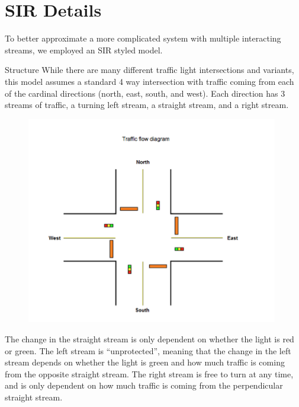 \documentclass[12pt]{article}
\begin{document}

\section{SIR Details}
To better approximate a more complicated system with multiple interacting streams, we employed an SIR styled model. 

Structure
While there are many different traffic light intersections and variants, this model assumes a standard 4 way intersection with traffic coming from each of the cardinal directions (north, east, south, and west). Each direction has 3 streams of traffic, a turning left stream, a straight stream, and a right stream. 

\begin{figure}[htp]
    \centering
    \includegraphics[width=11cm]{figures/TrafficDiagrampng.png}
    \label{fig:diagram}
\end{figure}

The change in the straight stream is only dependent on whether the light is red or green. The left stream is “unprotected”, meaning that the change in the left stream depends on whether the light is green and how much traffic is coming from the opposite straight stream. The right stream is free to turn at any time, and is only dependent on how much traffic is coming from the perpendicular straight stream.
\end{document}
